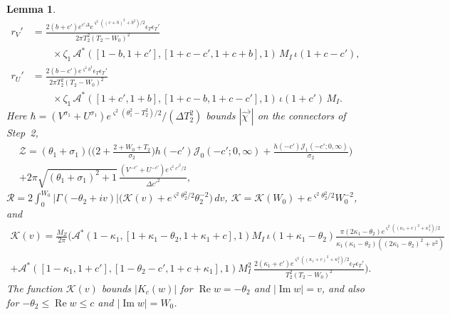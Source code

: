 \documentclass[11pt]{amsart}
\numberwithin{equation}{section}
\newtheorem{lemma}[theorem]{Lemma}
\theoremstyle{definition}
\theoremstyle{remark}
\newcommand{\Rp}{\operatorname{Re}}
\newcommand{\Ip}{\operatorname{Im}}
\begin{document}
\begin{lemma}
\begin{align*}
r_V' &= \frac{2(b + c')e^{c'\Delta}e^{\varsigma^2((c+b)^2 + b^2)/2}\epsilon_T\epsilon_T'}{2\pi T_2^2(T_2 - W_0)^2}\\
&\qquad\times\zeta_1\,\mathcal A^*([1 - b, 1 + c'], [1 + c - c', 1 + c + b], 1)\,M_I\,\iota(1 + c - c'),\\
r_U' &= \frac{2(b - c')e^{\varsigma^2b^2}\epsilon_T\epsilon_T'}{2\pi T_2^2(T_2 - W_0)^2}\\
&\qquad\times\zeta_1\,\mathcal A^*([1 + c', 1 + b], [1 + c - b, 1 + c - c'], 1)\,\iota(1 + c')\,M_I.
\end{align*}
Here $\hbar = (V^{\sigma_1} + U^{\sigma_1})e^{\varsigma^2(\theta_1^2 - T_2^2)/2}/(\Delta T_2^2)$ bounds $|\hat\chi^\flat|$ on the connectors of Step~2,
\begin{multline*}
\mathcal Z = (\theta_1 + \sigma_1)\Big(\Big(2 + \frac{2 + W_0 + T_2}{\sigma_2}\Big)h(-c')\mathcal J_0(-c'; 0, \infty) + \frac{h(-c')\mathcal J_1(-c'; 0, \infty)}{\sigma_2}\Big)\\
+ 2\pi\sqrt{(\theta_1 + \sigma_1)^2 + 1}\,\frac{(V^{-c'} + U^{-c'})e^{\varsigma^2c'^2/2}}{\Delta c'^2},
\end{multline*}
$\mathcal R = 2\int_0^{W_0}|\Gamma(-\theta_2 + iv)|\big(\mathcal K(v) + e^{\varsigma^2\theta_2^2/2}\theta_2^{-2}\big)\,dv$, $\mathcal K = \mathcal K(W_0) + e^{\varsigma^2\theta_2^2/2}W_0^{-2}$, and
\begin{multline*}
\mathcal K(v) = \frac{M_Z}{2\pi}\Big(\mathcal A^*(1 - \kappa_1, [1 + \kappa_1 - \theta_2, 1 + \kappa_1 + c], 1)M_I\,\iota(1 + \kappa_1 - \theta_2)\frac{\pi(2\kappa_1 - \theta_2)e^{\varsigma^2((\kappa_1 + c)^2 + \kappa_1^2)/2}}{\kappa_1(\kappa_1 - \theta_2)((2\kappa_1 - \theta_2)^2 + v^2)}\\
+ \mathcal A^*([1 - \kappa_1, 1 + c'], [1 - \theta_2 - c', 1 + c + \kappa_1], 1)M_I^2\,\frac{2(\kappa_1 + c')e^{\varsigma^2((\kappa_1 + c)^2 + \kappa_1^2)/2}\epsilon_T\epsilon_T'}{T_2^2(T_2 - W_0)^2}\Big).
\end{multline*}
The function $\mathcal K(v)$ bounds $|K_c(w)|$ for $\Rp w = -\theta_2$ and $|\Ip w| = v$, and also for $-\theta_2 \leq \Rp w \leq c$ and $|\Ip w| = W_0$.
\end{lemma}
\end{document}
